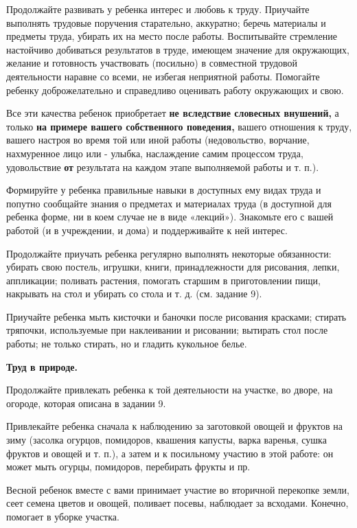 \documentclass[a5paper]{book}
\begin{document}
Продолжайте развивать у ребенка интерес и любовь к труду. Приучайте
выполнять трудовые поручения старательно, аккуратно; беречь материалы и
предметы труда, убирать их на место после работы. Воспитывайте
стремление настойчиво добиваться результатов в труде, имеющем значение
для окружающих, желание и готовность участвовать (посильно) в совместной
трудовой деятельности наравне со всеми, не избегая неприятной работы.
Помогайте ребенку доброжелательно и справедливо оценивать работу
окружающих и свою.

Все эти качества ребенок приобретает \textbf{не вследствие словесных
внушений,} а только \textbf{на примере вашего собственного поведения,}
вашего отношения к труду, вашего настроя во время той или иной работы
(недовольство, ворчание, нахмуренное лицо или - улыбка, наслаждение
самим процессом труда, удовольствие \textbf{от} результата на каждом
этапе выполняемой работы и т. п.).

Формируйте у ребенка правильные навыки в доступных ему видах труда и
попутно сообщайте знания о предметах и материалах труда (в доступной для
ребенка форме, ни в коем случае не в виде «лекций»). Знакомьте его с
вашей работой (и в учреждении, и дома) и поддерживайте к ней интерес.

Продолжайте приучать ребенка регулярно выполнять некоторые обязанности:
убирать свою постель, игрушки, книги, принадлежности для рисования,
лепки, аппликации; поливать растения, помогать старшим в приготовлении
пищи, накрывать на стол и убирать со стола и т. д. (см. задание 9).

Приучайте ребенка мыть кисточки и баночки после рисования красками;
стирать тряпочки, используемые при наклеивании и рисовании; вытирать
стол после работы; не только стирать, но и гладить кукольное белье.

\textbf{Труд в природе.}

Продолжайте привлекать ребенка к той деятельности на участке, во дворе,
на огороде, которая описана в задании 9.

Привлекайте ребенка сначала к наблюдению за заготовкой овощей и фруктов
на зиму (засолка огурцов, помидоров, квашения капусты, варка варенья,
сушка фруктов и овощей и т. п.), а затем и к посильному участию в этой
работе: он может мыть огурцы, помидоров, перебирать фрукты и пр.

Весной ребенок вместе с вами принимает участие во вторичной перекопке
земли, сеет семена цветов и овощей, поливает посевы, наблюдает за
всходами. Конечно, помогает в уборке участка.
\end{document}
